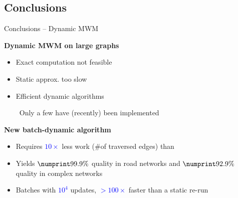 \documentclass[10pt,titlepage,english,presentation]{beamer}
\newcommand{\emphcolor}{blue}
\renewcommand{\emph}[1]{\textcolor{\emphcolor}{#1}}
\begin{document}
%
%
%

\subsection{Conclusions}
\begin{frame}{Conclusions -- Dynamic MWM}
\small

\textbf{Dynamic MWM on large graphs}
\begin{itemize}
    \small
    \item Exact computation not feasible
    \item Static approx. too slow
    \item[\faHandORight] Efficient dynamic algorithms\smallskip

        \faExclamationCircle\ Only a few have (recently) been
        implemented~\parencite{conf/acda/AngrimanMSU21}
\end{itemize}\medskip

\textbf{New batch-dynamic \suitor algorithm}
\begin{itemize}
\small
\item Requires \emph{$10\times$} less work (\#of traversed edges) than \dynmwmrandom
\item Yields \emph{$\qualRWRemRoadHighEps$} quality in road networks
    and \emph{$\qualRWRemCplxHighEps$} quality in complex networks
\item Batches with \emph{$10^4$} updates, \emph{$>100\times$} faster than a static
    re-run
\end{itemize}
\end{frame}
\end{document}
